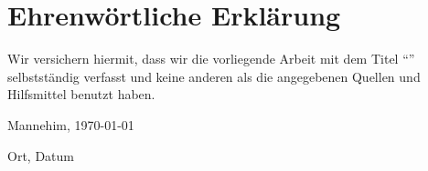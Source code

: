 \clearpage
\chapter*{Ehrenwörtliche Erklärung}


Wir versichern hiermit, dass wir die vorliegende Arbeit mit dem Titel ``\textit{\DerTitelDerArbeit}'' selbstständig verfasst und keine anderen als die angegebenen Quellen und Hilfsmittel benutzt haben.

\vspace{2.22cm}
Mannehim, \today

Ort, Datum \hfill 

